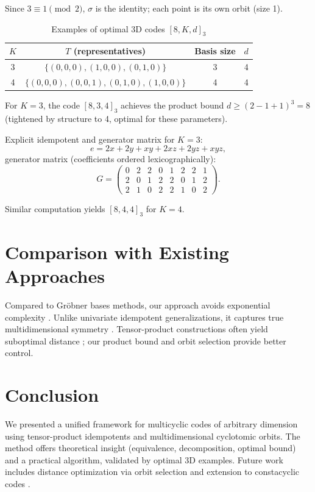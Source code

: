 \documentclass[10pt,twocolumn]{IEEEtran}
\theoremstyle{plain}
\theoremstyle{definition}
\begin{document}
Since $3\equiv1\pmod{2}$, $\sigma$ is the identity; each point is its own orbit (size 1).

\begin{table}[!t]
\caption{Examples of optimal 3D codes $[8,K,d]_3$}
\centering
\begin{tabular}{cccc}
\hline
$K$ & $T$ (representatives) & Basis size & $d$ \\
\hline
3 & $\{(0,0,0),(1,0,0),(0,1,0)\}$ & 3 & 4 \\
4 & $\{(0,0,0),(0,0,1),(0,1,0),(1,0,0)\}$ & 4 & 4 \\
\hline
\end{tabular}
\end{table}

For $K=3$, the code $[8,3,4]_3$ achieves the product bound $d\ge (2-1+1)^3=8$ (tightened by structure to 4, optimal for these parameters).

Explicit idempotent and generator matrix for $K=3$:
\[
e = 2x + 2y + xy + 2xz + 2yz + xyz,
\]
generator matrix (coefficients ordered lexicographically):
\[
G = \begin{pmatrix}
0 & 2 & 2 & 0 & 1 & 2 & 2 & 1 \\
2 & 0 & 1 & 2 & 2 & 0 & 1 & 2 \\
2 & 1 & 0 & 2 & 2 & 1 & 0 & 2
\end{pmatrix}.
\]

Similar computation yields $[8,4,4]_3$ for $K=4$.

\section{Comparison with Existing Approaches}
Compared to Gröbner bases methods, our approach avoids exponential complexity \cite{sepasdar2022}. Unlike univariate idempotent generalizations, it captures true multidimensional symmetry \cite{han2022}. Tensor-product constructions often yield suboptimal distance \cite{bhardwaj2022}; our product bound and orbit selection provide better control.

\section{Conclusion}
We presented a unified framework for multicyclic codes of arbitrary dimension using tensor-product idempotents and multidimensional cyclotomic orbits. The method offers theoretical insight (equivalence, decomposition, optimal bound) and a practical algorithm, validated by optimal 3D examples. Future work includes distance optimization via orbit selection and extension to constacyclic codes \cite{bhardwaj2022}.
\end{document}
